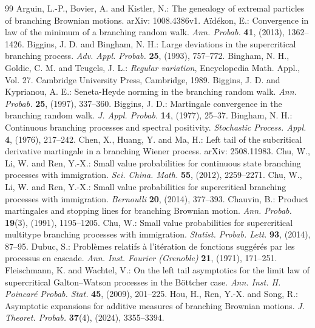 \documentclass[10pt,a4paper]{amsart}
\numberwithin{equation}{section}
\begin{document}
\begin{thebibliography}{99}
 Arguin, L.-P., Bovier, A. and Kistler, N.: The genealogy of extremal particles of branching Brownian motions. arXiv: 1008.4386v1.
 A\"id\'ekon, E.: Convergence in law of the minimum of a branching random walk. \emph{Ann. Probab.} \textbf{41}, (2013), 1362--1426.
 Biggins, J. D. and Bingham, N. H.: Large deviations in the supercritical branching process. \emph{Adv. Appl. Probab.} \textbf{25}, (1993), 757--772.
 Bingham, N. H., Goldie, C. M. and Teugels, J. L.: \emph{Regular variation}, Encyclopedia Math. Appl., Vol. 27. Cambridge University Press, Cambridge, 1989.
 Biggins, J. D. and Kyprianou, A. E.: Seneta-Heyde norming in the branching random walk. \emph{Ann. Probab.} \textbf{25}, (1997), 337--360.
 Biggins, J. D.: Martingale convergence in the branching random walk. \emph{J. Appl. Probab.} \textbf{14}, (1977), 25--37.
 Bingham, N. H.: Continuous branching processes and spectral positivity. \emph{Stochastic Process. Appl.} \textbf{4}, (1976), 217--242.
 Chen, X., Huang, Y. and Ma, H.: Left tail of the subcritical derivative martingale in a branching Wiener process. arXiv: 2508.11983.
 Chu, W., Li, W. and Ren, Y.-X.: Small value probabilities for continuous state branching processes with immigration. \emph{Sci. China. Math.} \textbf{55}, (2012), 2259--2271.
 Chu, W., Li, W. and Ren, Y.-X.: Small value probabilities for supercritical branching processes with immigration. \emph{Bernoulli} \textbf{20}, (2014), 377--393.
 Chauvin, B.: Product martingales and stopping lines for branching Brownian motion. \emph{Ann. Probab.} \textbf{19}(3), (1991), 1195--1205.
 Chu, W.: Small value probabilities for supercritical multitype branching processes with immigration. \emph{Statist. Probab. Lett.} \textbf{93}, (2014), 87--95.
 Dubuc, S.: Probl\`emes relatifs \`a l'it\'eration de fonctions sugg\'er\'es par les processus en cascade. \emph{Ann. Inst. Fourier (Grenoble)} \textbf{21}, (1971), 171--251.
 Fleischmann, K. and Wachtel, V.: On the left tail asymptotics for the limit law of supercritical Galton--Watson processes in the B\"ottcher case. \emph{Ann. Inst. H. Poincar\'e Probab. Stat.} \textbf{45}, (2009), 201--225.
 Hou, H., Ren, Y.-X. and Song, R.: Asymptotic expansions for additive measures of branching Brownian motions. \emph{J. Theoret. Probab.} \textbf{37}(4), (2024), 3355--3394.

\end{thebibliography}
\end{document}
